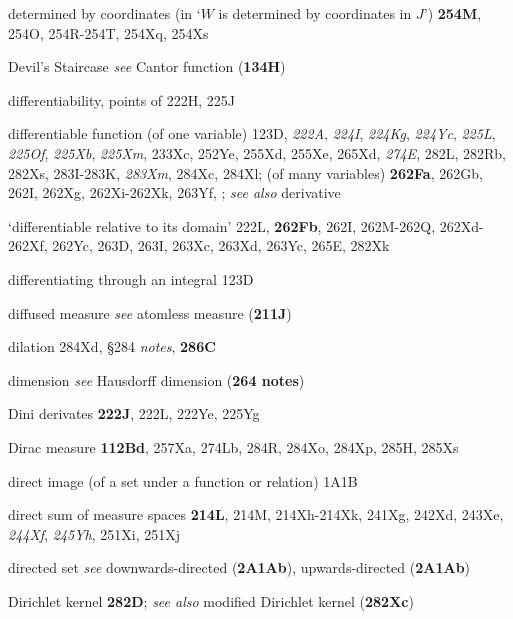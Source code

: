 determined by coordinates (in `$W$ is determined by coordinates in
$J$') {\bf 254M}, 254O, 254R-254T, 
254Xq, 254Xs





Devil's Staircase {\it see} Cantor function ({\bf 134H})











differentiability, points of 222H, 225J


differentiable function (of one variable) 123D,
  {\it 222A}, {\it 224I}, {\it 224Kg}, {\it 224Yc}, {\it 225L}, {\it
225Of}, {\it 225Xb}, {\it 225Xm}, 233Xc, 252Ye, 255Xd, 255Xe,
265Xd, {\it 274E}, 282L, 282Rb, 282Xs,
283I-283K, 
{\it 283Xm}, 284Xc, 284Xl;  
  (of many variables) {\bf 262Fa}, 262Gb, 262I, 262Xg,
262Xi-262Xk, 
263Yf, ;  
  {\it see also} derivative


`differentiable relative to its domain' 222L, {\bf 262Fb}, 262I,
262M-262Q, 
262Xd-262Xf, 
262Yc, 263D, 263I, 263Xc, 263Xd, 263Yc, 265E, 282Xk


differentiating through an integral 123D

diffused measure {\it see} atomless measure ({\bf 211J})


dilation 284Xd, \S284 {\it notes}, {\bf 286C}


dimension {\it see} Hausdorff dimension ({\bf 264 notes})


Dini derivates {\bf 222J}, 222L, 222Ye, 225Yg




Dirac measure {\bf 112Bd},
  257Xa, 274Lb, 284R, 284Xo, 284Xp, 285H, 285Xs

direct image (of a set under a function or relation) 1A1B

direct sum of measure spaces {\bf 214L}, 214M,
214Xh-214Xk, 
241Xg, 242Xd, 243Xe, {\it 244Xf}, {\it 245Yh}, 251Xi, 251Xj






directed set
{\it see} downwards-directed ({\bf 2A1Ab}),
upwards-directed ({\bf 2A1Ab})


Dirichlet kernel {\bf 282D};
{\it see also} modified Dirichlet kernel ({\bf 282Xc})















